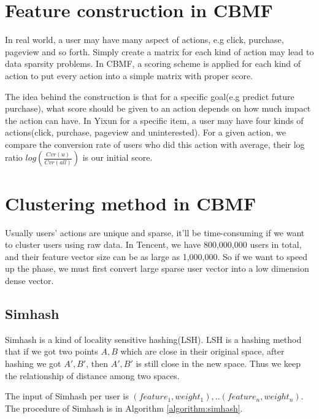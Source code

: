 \section{Feature construction in CBMF}

In real world, a user may have many aspect of actions, e.g click, purchase, pageview and so forth. Simply create a matrix for each kind of action may lead to data sparsity problems. In CBMF, a scoring scheme is applied for each kind of action to put every action into a simple matrix with proper score.

The idea behind the construction is that for a specific goal(e.g predict future purchase), what score should be given to an action depends on how much impact the action can have. In Yixun for a specific item, a user may have four kinds of actions(click, purchase, pageview and uninterested). For a given action, we compare the conversion rate of users who did this action with average, their log ratio $log(\frac{Cvr(u)}{Cvr(all)})$ is our initial score.



\section{Clustering method in CBMF}

Usually users' actions are unique and sparse, it'll be time-consuming if we want to cluster users using raw data. In Tencent, we have 800,000,000 users in total, and their feature vector size can be as large as 1,000,000. So if we want to speed up the phase, we must first convert large sparse user vector into a low dimension dense vector.

\subsection{Simhash}

Simhash is a kind of locality sensitive hashing(LSH). LSH is a hashing method that if we got two points $A,B$ which are close in their original space, after hashing we got $A',B'$, then $A',B'$ is still close in the new space. Thus we keep the relationship of distance among two spaces. 

The input of Simhash per user is $(feature_1, weight_1),..(feature_n,weight_n)$. The procedure of Simhash is in Algorithm \ref{algorithm:simhash}.

